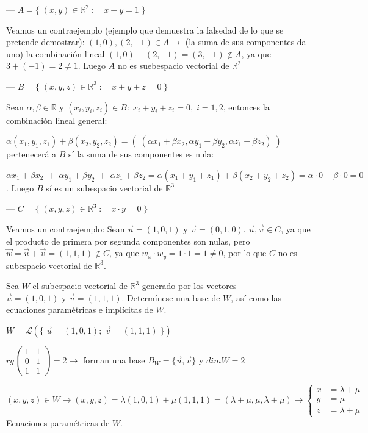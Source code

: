--- $A=\{\; (x,y)\in \mathbb R^2 \; :\quad x+y=1\;\} $

\noindent Veamos un contraejemplo \textcolor{gris}{(ejemplo que demuestra la falsedad de lo que se pretende demostrar)}: $(1,0), (2,-1) \in A \to$ (la suma de sus componentes da uno) la combinación lineal $(1,0) +( 2,-1)=(3,-1) \notin A$, ya que $3+(-1)=2\neq 1$. Luego $A$ no es suebespacio vectorial de $\mathbb R^2$
	
--- $B=\{\; (x,y,z)\in \mathbb R^3 \; : \quad x+y+z=0\;\} $

\noindent Sean $\alpha, \beta \in \mathbb R$ y $(x_i,y_i,z_i) \in B:\; x_i+y_i+z_i=0,\; i=1,2$, entonces la combinación lineal general: 

\noindent $\alpha (x_1,y_1,z_1)+\beta (x_2,y_2,z_2)=\left(\;  (\alpha x_1+\beta x_2, \alpha y_1+\beta y_2, \alpha z_1+\beta z_2)\; \right)$ pertenecerá a $B$ sí la suma de sus componentes es nula:

\noindent $\alpha x_1+\beta x_2\; +\; \alpha y_1+\beta y_2 \; +\; \alpha z_1+\beta z_2 = \alpha(x_1+y_1+z_1)+\beta (x_2+y_2+z_2)=\alpha \cdot 0 + \beta \cdot 0=0$. Luego $B$ sí es un subespacio vectorial de $\mathbb R^3$
	
--- $C=\{\;(x,y,z)\in \mathbb R^3 \; : \quad x\cdot y=0 \;\} $

\noindent Veamos un contraejemplo: Sean $\vec u=(1,0,1)$ y $\vec v=(0,1,0)$. $\vec u, \vec v \in C$, ya que el producto de primera por segunda componentes son nulas, pero $\vec w=\vec u + \vec v =(1,1,1)\notin C$, ya que $w_x\cdot w_y=1\cdot 1 = 1 \neq 0$, por lo que $C$ no es subespacio vectorial de $\mathbb R^3$.


\begin{miejercicio}
	
	Sea $W$ el subespacio vectorial de $\mathbb R^3$ generado por los vectores $\vec u=(1,0,1) \text{ y } \vec v=(1,1,1)$. Determínese una base de $W$, así como las ecuaciones paramétricas e implícitas de $W$.
\end{miejercicio}


	$W=\mathcal L \left( \{\; \vec u=(1,0,1); \; \vec v=(1,1,1) \; \} \right)$
	
\noindent $rg \left( \begin{matrix} 1&1\\0&1\\1&1 \end{matrix} \right)=2 \to $ forman una base $B_W=\{\vec u, \vec v\}$ y  $dim W=2$

\noindent $(x,y,z)\in W \to (x,y,z)=\lambda (1,0,1)+\mu (1,1,1)=(\lambda+\mu, \mu, \lambda+\mu) \to \begin{cases} x&=\lambda+\mu \\y&=\mu\\ z&= \lambda+\mu \end{cases}$ Ecuaciones paramétricas de $W$.

